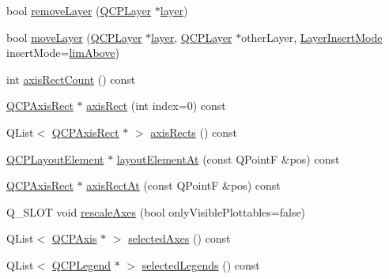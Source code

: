 \begin{DoxyCompactItemize}
\item 
bool \mbox{\hyperlink{class_q_custom_plot_a40f75e342c5eaab6a86066a42a0e2a94}{remove\+Layer}} (\mbox{\hyperlink{class_q_c_p_layer}{Q\+C\+P\+Layer}} $\ast$\mbox{\hyperlink{class_q_custom_plot_a0a96244e7773b242ef23c32b7bdfb159}{layer}})
\item 
bool \mbox{\hyperlink{class_q_custom_plot_ae896140beff19424e9e9e02d6e331104}{move\+Layer}} (\mbox{\hyperlink{class_q_c_p_layer}{Q\+C\+P\+Layer}} $\ast$\mbox{\hyperlink{class_q_custom_plot_a0a96244e7773b242ef23c32b7bdfb159}{layer}}, \mbox{\hyperlink{class_q_c_p_layer}{Q\+C\+P\+Layer}} $\ast$other\+Layer, \mbox{\hyperlink{class_q_custom_plot_a75a8afbe6ef333b1f3d47abb25b9add7}{Layer\+Insert\+Mode}} insert\+Mode=\mbox{\hyperlink{class_q_custom_plot_a75a8afbe6ef333b1f3d47abb25b9add7a062b0b7825650b432a713c0df6742d41}{lim\+Above}})
\item 
int \mbox{\hyperlink{class_q_custom_plot_a8f85940aaac50efb466287d9d2d04ec6}{axis\+Rect\+Count}} () const
\item 
\mbox{\hyperlink{class_q_c_p_axis_rect}{Q\+C\+P\+Axis\+Rect}} $\ast$ \mbox{\hyperlink{class_q_custom_plot_ae5eefcb5f6ca26689b1fd4f6e25b42f9}{axis\+Rect}} (int index=0) const
\item 
Q\+List$<$ \mbox{\hyperlink{class_q_c_p_axis_rect}{Q\+C\+P\+Axis\+Rect}} $\ast$ $>$ \mbox{\hyperlink{class_q_custom_plot_a12af771429e2d7e313c8c5d5fca068fe}{axis\+Rects}} () const
\item 
\mbox{\hyperlink{class_q_c_p_layout_element}{Q\+C\+P\+Layout\+Element}} $\ast$ \mbox{\hyperlink{class_q_custom_plot_afaa1d304e0287d140fd238e90889ef3c}{layout\+Element\+At}} (const Q\+PointF \&pos) const
\item 
\mbox{\hyperlink{class_q_c_p_axis_rect}{Q\+C\+P\+Axis\+Rect}} $\ast$ \mbox{\hyperlink{class_q_custom_plot_a4a08842fc3e9ba6bed83aa410c5c5ba5}{axis\+Rect\+At}} (const Q\+PointF \&pos) const
\item 
Q\+\_\+\+S\+L\+OT void \mbox{\hyperlink{class_q_custom_plot_ad86528f2cee6c7e446dea4a6e8839935}{rescale\+Axes}} (bool only\+Visible\+Plottables=false)
\item 
Q\+List$<$ \mbox{\hyperlink{class_q_c_p_axis}{Q\+C\+P\+Axis}} $\ast$ $>$ \mbox{\hyperlink{class_q_custom_plot_a7e6b07792b1cb2c31681596582d14dbe}{selected\+Axes}} () const
\item 
Q\+List$<$ \mbox{\hyperlink{class_q_c_p_legend}{Q\+C\+P\+Legend}} $\ast$ $>$ \mbox{\hyperlink{class_q_custom_plot_ac87624ddff1cbf4064781a8e8ae321c4}{selected\+Legends}} () const
\item 

\end{DoxyCompactItemize}
